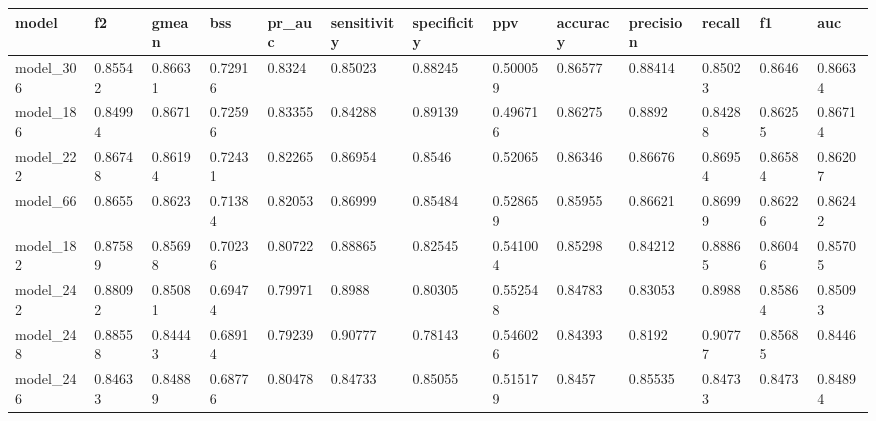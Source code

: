 \begin{tabular}{|l|l|l|l|l|l|l|l|l|l|l|l|l|}
\hline
\textbf{model} & \textbf{f2} & \textbf{gmean} & \textbf{bss} & \textbf{pr\_auc} & \textbf{sensitivity} & \textbf{specificity} & \textbf{ppv} & \textbf{accuracy} & \textbf{precision} & \textbf{recall} & \textbf{f1} & \textbf{auc} \\ \hline
model\_306     & 0.85542     & 0.86631        & 0.72916      & 0.8324           & 0.85023              & 0.88245              & 0.500059     & 0.86577           & 0.88414            & 0.85023         & 0.8646      & 0.86634      \\ \hline
model\_186     & 0.84994     & 0.8671         & 0.72596      & 0.83355          & 0.84288              & 0.89139              & 0.496716     & 0.86275           & 0.8892             & 0.84288         & 0.86255     & 0.86714      \\ \hline
model\_222     & 0.86748     & 0.86194        & 0.72431      & 0.82265          & 0.86954              & 0.8546               & 0.52065      & 0.86346           & 0.86676            & 0.86954         & 0.86584     & 0.86207      \\ \hline
model\_66      & 0.8655      & 0.8623         & 0.71384      & 0.82053          & 0.86999              & 0.85484              & 0.528659     & 0.85955           & 0.86621            & 0.86999         & 0.86226     & 0.86242      \\ \hline
model\_182     & 0.87589     & 0.85698        & 0.70236      & 0.80722          & 0.88865              & 0.82545              & 0.541004     & 0.85298           & 0.84212            & 0.88865         & 0.86046     & 0.85705      \\ \hline
model\_242     & 0.88092     & 0.85081        & 0.69474      & 0.79971          & 0.8988               & 0.80305              & 0.552548     & 0.84783           & 0.83053            & 0.8988          & 0.85864     & 0.85093      \\ \hline
model\_248     & 0.88558     & 0.84443        & 0.68914      & 0.79239          & 0.90777              & 0.78143              & 0.546026     & 0.84393           & 0.8192             & 0.90777         & 0.85685     & 0.8446       \\ \hline
model\_246     & 0.84633     & 0.84889        & 0.68776      & 0.80478          & 0.84733              & 0.85055              & 0.515179     & 0.8457            & 0.85535            & 0.84733         & 0.8473      & 0.84894      \\ \hline

\end{tabular}
